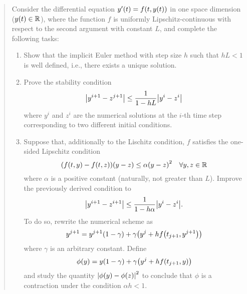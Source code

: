 \documentclass{exercise}
\begin{document}
	\begin{quote}
		Consider the differential equation \(y'\parentheses*{t} = f\parentheses*{t, y\parentheses*{t}}\) in one space dimension (\(y\parentheses*{t} \in \R\)), where the function \(f\) is uniformly Lipschitz-continuous with respect to the second argument with constant \(L\), and complete the following tasks:
		\begin{enumerate}
			\item Show that the implicit Euler method with step size \(h\) such that \(hL < 1\) is well defined, i.e., there exists a unique solution.
			\item Prove the stability condition
			\[
				\absolute*{y^{i + 1} - z^{j + 1}} \le \frac{1}{1 - hL}\absolute*{y^i - z^i}
			\]
			where \(y^i\) and \(z^i\) are the numerical solutions at the \(i\)-th time step corresponding to two different initial conditions.
			\item Suppose that, additionally to the Lischitz condition, \(f\) satisfies the one-sided Lipschitz condition
			\[
				\parentheses*{f\parentheses*{t, y} - f\parentheses*{t, z}}\parentheses*{y - z} \le \alpha\parentheses*{y - z}^2 \quad \forall y, z \in \R
			\]
			where \(\alpha\) is a positive constant (naturally, not greater than \(L\)).
			Improve the previously derived condition to
			\[
				\absolute*{y^{i + 1} - z^{i + 1}} \le \frac{1}{1 - h\alpha}\absolute*{y^i - z^i}.
			\]
			To do so, rewrite the numerical scheme as
			\[
				y^{j + 1} = y^{j + 1}\parentheses*{1 - \gamma} + \gamma\parentheses*{y^j + hf\parentheses*{t_{j + 1}, y^{j + 1}}}
			\]
			where \(\gamma\) is an arbitrary constant.
			Define
			\[
				\phi\parentheses*{y} = y\parentheses*{1 - \gamma} + \gamma\parentheses*{y^j + hf\parentheses*{t_{j + 1}, y}}
			\]
			and study the quantity \(\absolute*{\phi\parentheses*{y} - \phi\parentheses*{z}}^2\) to conclude that \(\phi\) is a contraction under the condition \(\alpha h < 1\).
		\end{enumerate}
	\end{quote}
\end{document}
